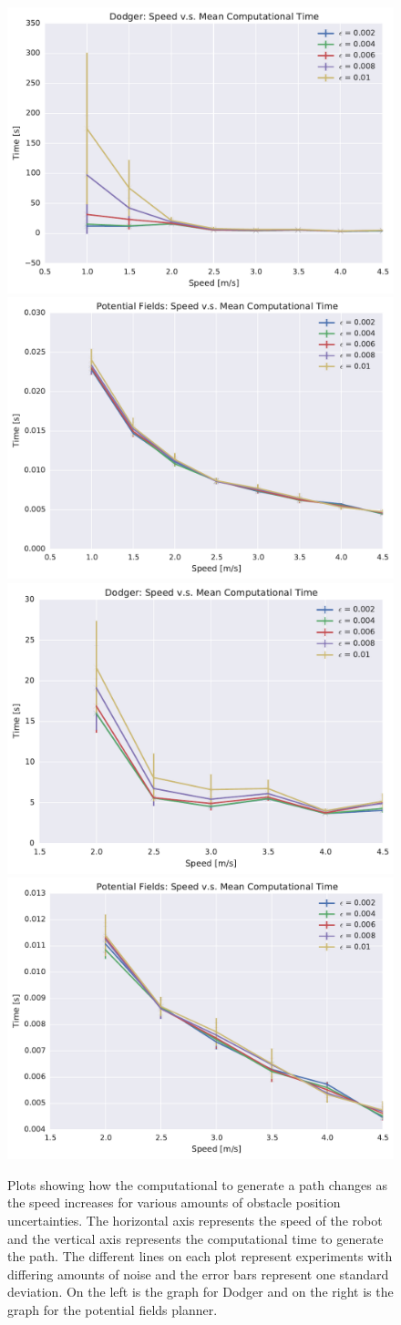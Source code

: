 \begin{figure}[h!]
    \centering
    \includegraphics[width=0.48\linewidth]{figs/planner_mean_times_0}
    \includegraphics[width=0.48\linewidth]{figs/pf_mean_times_0} \\
    \includegraphics[width=0.48\linewidth]{figs/planner_small_mean_times_0}
    \includegraphics[width=0.48\linewidth]{figs/pf_small_mean_times_0}

    \caption{Plots showing how the computational to generate a path changes as
        the speed increases for various amounts of obstacle position
        uncertainties.  The horizontal axis represents the speed of the robot
        and the vertical axis represents the computational time to generate the
        path. The different lines on each plot represent experiments with
        differing amounts of noise and the error bars represent one standard
        deviation.  On the left is the graph for Dodger and on the right is the
    graph for the potential fields planner.}

    \label{fig:plot_comp_time}
\end{figure}

